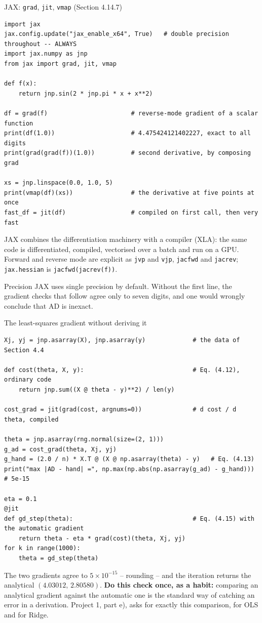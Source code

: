 \documentclass[10pt,aspectratio=169]{beamer}
\begin{document}
\begin{frame}[fragile]{JAX: \texttt{grad}, \texttt{jit}, \texttt{vmap} (Section 4.14.7)}
\begin{lstlisting}
import jax
jax.config.update("jax_enable_x64", True)   # double precision throughout -- ALWAYS
import jax.numpy as jnp
from jax import grad, jit, vmap

def f(x):
    return jnp.sin(2 * jnp.pi * x + x**2)

df = grad(f)                       # reverse-mode gradient of a scalar function
print(df(1.0))                     # 4.475424121402227, exact to all digits
print(grad(grad(f))(1.0))          # second derivative, by composing grad

xs = jnp.linspace(0.0, 1.0, 5)
print(vmap(df)(xs))                # the derivative at five points at once
fast_df = jit(df)                  # compiled on first call, then very fast
\end{lstlisting}
\small
JAX combines the differentiation machinery with a compiler (XLA): the same
code is differentiated, compiled, vectorised over a batch and run on a GPU.
Forward and reverse mode are explicit as \texttt{jvp} and \texttt{vjp},
\texttt{jacfwd} and \texttt{jacrev}; \texttt{jax.hessian} is
\texttt{jacfwd(jacrev(f))}.
\begin{block}{Precision}
JAX uses single precision by default.  Without the first line, the gradient
checks that follow agree only to seven digits, and one would wrongly conclude
that AD is inexact.
\end{block}
\end{frame}

\begin{frame}[fragile]{The least-squares gradient without deriving it}
\begin{lstlisting}
Xj, yj = jnp.asarray(X), jnp.asarray(y)             # the data of Section 4.4

def cost(theta, X, y):                              # Eq. (4.12), ordinary code
    return jnp.sum((X @ theta - y)**2) / len(y)

cost_grad = jit(grad(cost, argnums=0))              # d cost / d theta, compiled

theta = jnp.asarray(rng.normal(size=(2, 1)))
g_ad = cost_grad(theta, Xj, yj)
g_hand = (2.0 / n) * X.T @ (X @ np.asarray(theta) - y)   # Eq. (4.13)
print("max |AD - hand| =", np.max(np.abs(np.asarray(g_ad) - g_hand)))   # 5e-15

eta = 0.1
@jit
def gd_step(theta):                                 # Eq. (4.15) with the automatic gradient
    return theta - eta * grad(cost)(theta, Xj, yj)
for k in range(1000):
    theta = gd_step(theta)
\end{lstlisting}
\small
The two gradients agree to $5\times10^{-15}$ -- rounding -- and the iteration
returns the analytical $(4.03012,\,2.80580)$.  \textbf{Do this check once,
as a habit:} comparing an analytical gradient against the automatic one is
the standard way of catching an error in a derivation.  Project 1, part e),
asks for exactly this comparison, for OLS and for Ridge.
\end{frame}
\end{document}
